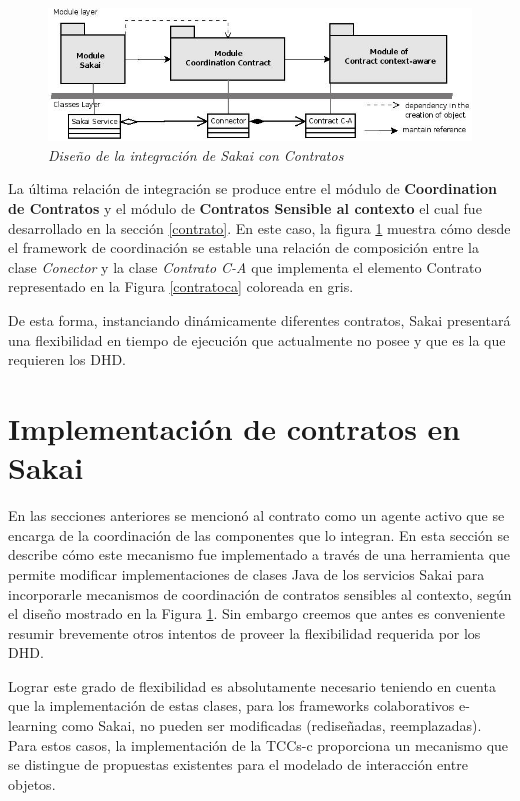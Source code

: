 \begin{figure}[!ht]
\begin{center}
	\includegraphics[width=4.5 in,totalheight=2.4 in]{Ch5/f2}
	\caption{\small \sl Diseño de la integración de Sakai con Contratos} \label{macroarquitectura}
\end{center}
\end{figure}

La última relación de integración se produce entre el módulo de \textbf{Coordination de Contratos } y el módulo de \textbf{Contratos Sensible al contexto} el cual fue  desarrollado en la sección \ref{contrato}. En este caso, la figura \ref{macroarquitectura} muestra cómo desde el framework de coordinación se estable una relación de composición entre la clase \textit{Conector} y la clase \textit{Contrato C-A} que implementa el elemento Contrato representado en la Figura \ref{contratoca} coloreada en gris.

De esta forma, instanciando dinámicamente diferentes contratos, Sakai presentará una flexibilidad en tiempo de ejecución que actualmente no posee y que es la que requieren los DHD. 
 

\section{Implementación de contratos en Sakai} \label{patron}

En las secciones anteriores se mencionó al contrato como un agente activo que se encarga de la coordinación de las componentes que lo integran. En esta sección se describe cómo este mecanismo fue implementado a través de una herramienta que permite modificar implementaciones de clases Java de los servicios Sakai para incorporarle mecanismos de coordinación de contratos sensibles al contexto, según el diseño mostrado en la Figura \ref{macroarquitectura}. Sin embargo creemos que antes es conveniente resumir brevemente otros intentos de proveer la flexibilidad requerida por los DHD.

Lograr este grado de flexibilidad es absolutamente necesario teniendo en cuenta que la implementación de estas clases, para los frameworks colaborativos e-learning como Sakai, no pueden ser modificadas (rediseñadas, reemplazadas). Para estos casos, la implementación de la TCCs-c proporciona un mecanismo que se distingue de propuestas existentes para el modelado de interacción entre objetos. 

